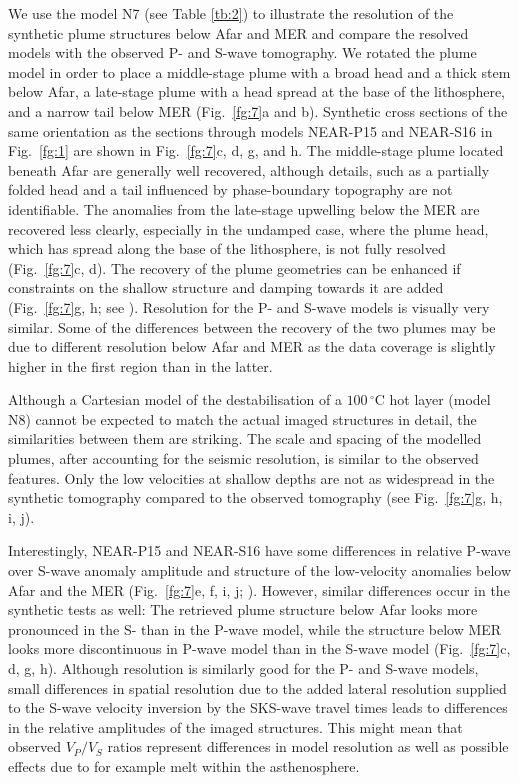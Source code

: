 \documentclass[a4paper,10pt,twocolumn]{paper}
\begin{document}
We use the model N7 (see Table \ref{tb:2}) to illustrate the resolution of the synthetic plume structures below Afar and MER and compare the resolved models with the observed P- and S-wave tomography. We rotated the plume model in order to place a middle-stage plume with a broad head and a thick stem below Afar, a late-stage plume with a head spread at the base of the lithosphere, and a narrow tail below MER (Fig.~\ref{fg:7}a and b). Synthetic cross sections of the same orientation as the sections through models NEAR-P15 and NEAR-S16 in Fig.~\ref{fg:1} are shown in Fig.~\ref{fg:7}c, d, g, and h. The middle-stage plume located beneath Afar are generally well recovered, although details, such as a partially folded head and a tail influenced by phase-boundary topography are not identifiable. The anomalies from the late-stage upwelling below the MER are recovered less clearly, especially in the undamped case, where the plume head, which has spread along the base of the lithosphere, is not fully resolved (Fig.~\ref{fg:7}c, d). The recovery of the plume geometries can be enhanced if constraints on the shallow structure and damping towards it are added (Fig.~\ref{fg:7}g, h; see \citealp{civiero-etal-2016,civiero-etal-2015}). Resolution for the P- and S-wave models is visually very similar. Some of the differences between the recovery of the two plumes may be due to different resolution below Afar and MER as the data coverage is slightly higher in the first region than in the latter.

Although a Cartesian model of the destabilisation of a $100\,^{\circ}$C hot layer (model N8) cannot be expected to match the actual imaged structures in detail, the similarities between them are striking. The scale and spacing of the modelled plumes, after accounting for the seismic resolution, is similar to the observed features. Only the low velocities at shallow depths are not as
widespread in the synthetic tomography compared to the observed tomography (see Fig.~\ref{fg:7}g, h, i, j).

Interestingly, NEAR-P15 and NEAR-S16 have some differences in relative P-wave over S-wave anomaly amplitude and structure of the low-velocity anomalies below Afar and the MER (Fig.~\ref{fg:7}e, f, i, j; \citealp{civiero-etal-2016}). However, similar differences occur in the synthetic tests as well: The retrieved plume structure below Afar looks more pronounced in the S- than in the P-wave model, while the structure below MER looks more discontinuous in P-wave model than in the S-wave model (Fig.~\ref{fg:7}c, d, g, h). Although resolution is similarly good for the P- and S-wave models, small differences in spatial resolution due to the added lateral resolution supplied to the S-wave velocity inversion by the SKS-wave travel times leads to differences in the relative amplitudes of the imaged structures. This might mean that observed $V_{P}/V_{S}$ ratios represent differences in model resolution as well as possible effects due to for example melt within the asthenosphere.
\end{document}
